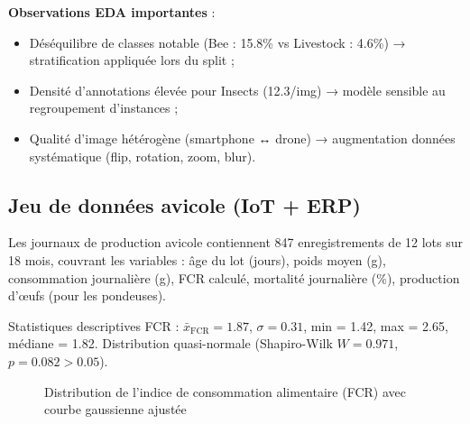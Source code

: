\textbf{Observations EDA importantes} :
\begin{itemize}
  \item Déséquilibre de classes notable (Bee : 15.8\% vs Livestock : 4.6\%) →
        stratification appliquée lors du split ;
  \item Densité d'annotations élevée pour Insects (12.3/img) → modèle sensible
        au regroupement d'instances ;
  \item Qualité d'image hétérogène (smartphone ↔ drone) → augmentation
        données systématique (flip, rotation, zoom, blur).
\end{itemize}

\subsection{Jeu de données avicole (IoT + ERP)}
Les journaux de production avicole contiennent 847 enregistrements de 12 lots
sur 18 mois, couvrant les variables : âge du lot (jours), poids moyen (g),
consommation journalière (g), FCR calculé, mortalité journalière (\%), production
d'œufs (pour les pondeuses).

Statistiques descriptives FCR :
$\bar{x}_\text{FCR} = 1.87$, $\sigma = 0.31$, min = 1.42, max = 2.65,
médiane = 1.82. Distribution quasi-normale (Shapiro-Wilk $W = 0.971$,
$p = 0.082 > 0.05$).

\begin{figure}[H]
\centering
{}
\caption{Distribution de l'indice de consommation alimentaire (FCR) avec courbe gaussienne ajustée}
\label{fig:fcr_hist}
\end{figure}

